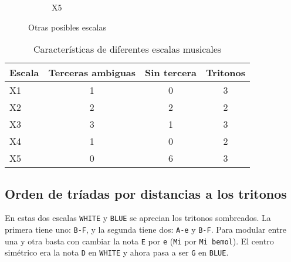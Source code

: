 \documentclass[]{article}
\begin{document}
\begin{figure}[H]
\begin{subfigure}{0.15\textwidth}
  \end{subfigure}
  \hfill
  \begin{subfigure}{0.15\textwidth}
    \centering
    \caption{\textsf{X5}}
    
  \end{subfigure}
  \hfill
  \caption{Otras posibles escalas}\label{fig:more-posible-scales}
\end{figure}

\begin{table}[H]
  \centering
  \begin{tabular}{lccc}
    \toprule
    Escala & Terceras ambiguas & Sin tercera & Tritonos \\
    \midrule
    X1 & 1 & 0 & 3 \\
    X2 & 2 & 2 & 2 \\
    X3 & 3 & 1 & 3 \\
    X4 & 1 & 0 & 2 \\
    X5 & 0 & 6 & 3 \\
    \bottomrule
  \end{tabular}
  \caption{Características de diferentes escalas musicales}\label{tab:escalas}
\end{table}

\subsection{Orden de tríadas por distancias a los tritonos}

En estas dos escalas \texttt{WHITE} y \texttt{BLUE} se aprecian los tritonos sombreados. La primera tiene uno: \texttt{B-F}, y la segunda tiene dos: \texttt{A-e} y \texttt{B-F}. Para modular entre una y otra basta con cambiar la nota \texttt{E} por \texttt{e} (\texttt{Mi} por \texttt{Mi\ bemol}). El centro simétrico era la nota \texttt{D} en \texttt{WHITE} y ahora pasa a ser \texttt{G} en \texttt{BLUE}. 
\end{document}
